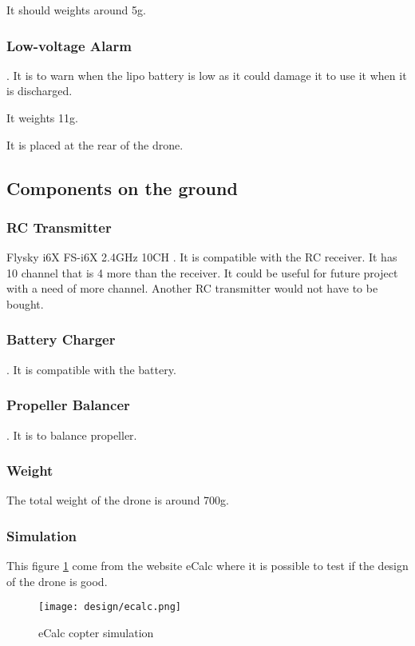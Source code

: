 It should weights around 5g.

\subsubsection{Low-voltage Alarm}
\cite{bangood_battery_monitor}. It is to warn when the lipo battery is low as it could damage it to use it when it is discharged.

It weights 11g.

It is placed at the rear of the drone.

\subsection{Components on the ground}

\subsubsection{RC Transmitter}
Flysky i6X FS-i6X 2.4GHz 10CH \cite{bangood_transmitter}. It is compatible with the RC receiver. It has 10 channel that is 4 more than the receiver. It could be useful for future project with a need of more channel. Another RC transmitter would not have to be bought.

\subsubsection{Battery Charger}
\cite{bangood_battery_charger}. It is compatible with the battery.

\subsubsection{Propeller Balancer}
\cite{bangood_prop_balancer}. It is to balance propeller.

\subsubsection{Weight}
The total weight of the drone is around 700g.

\subsubsection{Simulation}
This figure \ref{fig:ecalc} come from the website eCalc where it is possible to test if the design of the drone is good.
\begin{figure}[!ht]
    \centering
    \texttt{[image: design/ecalc.png]}
    \caption{eCalc copter simulation}
    \label{fig:ecalc}
\end{figure}
